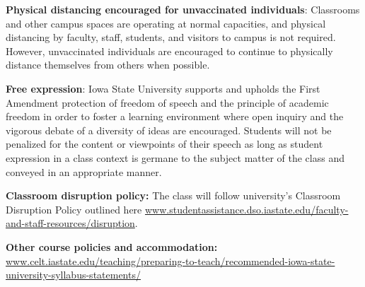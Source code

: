 \documentclass[10pt]{article}
\newcommand{\sep}{\vspace*{0.4cm}}
\begin{document}
\textbf{Physical distancing encouraged for unvaccinated individuals}: Classrooms and other campus spaces are operating at normal capacities, and physical distancing by faculty, staff, students, and visitors to campus is not required. However, unvaccinated individuals are encouraged to continue to physically distance themselves from others when possible.
\sep

\textbf{Free expression}: Iowa State University supports and upholds the First Amendment protection of freedom of speech and the principle of academic freedom in order to foster a learning environment where open inquiry and the vigorous debate of a diversity of ideas are encouraged. Students will not be penalized for the content or viewpoints of their speech as long as student expression in a class context is germane to the subject matter of the class and conveyed in an appropriate manner.
\sep

\textbf{Classroom disruption policy:}
The class will follow university's Classroom Disruption Policy outlined here \url{www.studentassistance.dso.iastate.edu/faculty-and-staff-resources/disruption}.
\sep


\textbf{Other course policies and accommodation:} \url{www.celt.iastate.edu/teaching/preparing-to-teach/recommended-iowa-state-university-syllabus-statements/}
\end{document}
